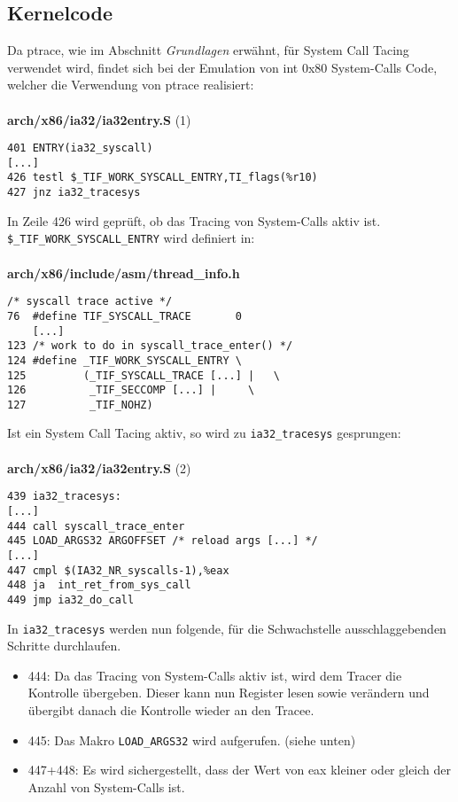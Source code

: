 \documentclass[11pt,a4paper]{article}
\begin{document}
{\subsection{Kernelcode}
Da ptrace, wie im Abschnitt \emph{Grundlagen} erwähnt, für System Call Tacing verwendet wird, findet sich bei der Emulation von int 0x80 System-Calls Code, welcher die Verwendung von ptrace realisiert:\\
\\
\textbf{arch/x86/ia32/ia32entry.S} (1)
\begin{lstlisting}[frame=single]
401 ENTRY(ia32_syscall)
[...]
426 testl $_TIF_WORK_SYSCALL_ENTRY,TI_flags(%r10)
427 jnz ia32_tracesys
\end{lstlisting}
In Zeile 426 wird geprüft, ob das Tracing von System-Calls aktiv ist.\\
\texttt{\$\_TIF\_WORK\_SYSCALL\_ENTRY} wird definiert in:\\
\\
\textbf{arch/x86/include/asm/thread\_info.h}
\begin{lstlisting}[frame=single]
    /* syscall trace active */
76  #define TIF_SYSCALL_TRACE       0
    [...]
123 /* work to do in syscall_trace_enter() */
124 #define _TIF_WORK_SYSCALL_ENTRY \
125         (_TIF_SYSCALL_TRACE [...] |   \
126          _TIF_SECCOMP [...] |     \
127          _TIF_NOHZ)
\end{lstlisting}
Ist ein System Call Tacing aktiv, so wird zu \texttt{ia32\_tracesys} gesprungen:\\
\\
\textbf{arch/x86/ia32/ia32entry.S} (2)
\begin{lstlisting}[frame=single]
439 ia32_tracesys:
[...]
444 call syscall_trace_enter
445 LOAD_ARGS32 ARGOFFSET /* reload args [...] */
[...]
447 cmpl $(IA32_NR_syscalls-1),%eax
448 ja  int_ret_from_sys_call
449 jmp ia32_do_call
\end{lstlisting}
In \texttt{ia32\_tracesys} werden nun folgende, für die Schwachstelle ausschlaggebenden Schritte durchlaufen.
\begin{itemize}
\item 444: Da das Tracing von System-Calls aktiv ist, wird dem Tracer die Kontrolle übergeben. Dieser kann nun Register lesen sowie verändern und übergibt danach die Kontrolle wieder an den Tracee.
\item 445: Das Makro \texttt{LOAD\_ARGS32} wird aufgerufen. (siehe unten)
\item 447+448: Es wird sichergestellt, dass der Wert von eax kleiner oder gleich der Anzahl von System-Calls ist.

\end{itemize}}
\end{document}
